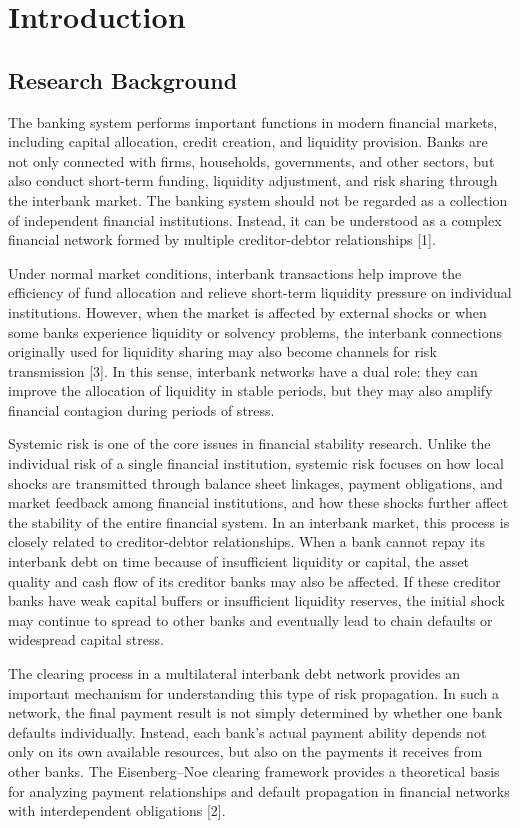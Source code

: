 \chapter{Introduction}

\section{Research Background}

The banking system performs important functions in modern financial
markets, including capital allocation, credit creation, and liquidity
provision. Banks are not only connected with firms, households,
governments, and other sectors, but also conduct short-term funding,
liquidity adjustment, and risk sharing through the interbank market. The
banking system should not be regarded as a collection of independent
financial institutions. Instead, it can be understood as a complex
financial network formed by multiple creditor-debtor
relationships {[}1{]}.

Under normal market conditions, interbank transactions help improve the
efficiency of fund allocation and relieve short-term liquidity pressure
on individual institutions. However, when the market is affected by
external shocks or when some banks experience liquidity or solvency
problems, the interbank connections originally used for liquidity
sharing may also become channels for risk transmission {[}3{]}. In this
sense, interbank networks have a dual role: they can improve the
allocation of liquidity in stable periods, but they may also amplify
financial contagion during periods of stress.

Systemic risk is one of the core issues in financial stability research.
Unlike the individual risk of a single financial institution, systemic
risk focuses on how local shocks are transmitted through balance sheet
linkages, payment obligations, and market feedback among financial
institutions, and how these shocks further affect the stability of the
entire financial system. In an interbank market, this process is closely
related to creditor-debtor relationships. When a bank cannot repay its
interbank debt on time because of insufficient liquidity or capital, the
asset quality and cash flow of its creditor banks may also be affected.
If these creditor banks have weak capital buffers or insufficient
liquidity reserves, the initial shock may continue to spread to other
banks and eventually lead to chain defaults or widespread capital
stress.

The clearing process in a multilateral interbank debt network provides
an important mechanism for understanding this type of risk propagation.
In such a network, the final payment result is not simply determined by
whether one bank defaults individually. Instead, each bank's actual
payment ability depends not only on its own available resources, but
also on the payments it receives from other banks. The Eisenberg--Noe
clearing framework provides a theoretical basis for analyzing payment
relationships and default propagation in financial networks with
interdependent obligations {[}2{]}.

